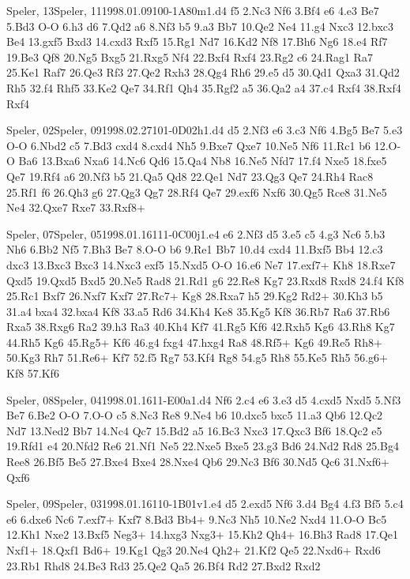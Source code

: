 \documentclass[twocolumn,a4paper,10pt]{report}
\begin{document}
\begin{chessgame}{Speler, 13}{Speler, 11}{1998.01.09}{10}{0-1}{A80m}{1.d4 f5 2.Nc3 Nf6 3.Bf4 e6 4.e3 Be7 5.Bd3 O-O 6.h3 d6 7.Qd2 a6 8.Nf3 b5 9.a3 Bb7 10.Qe2 Ne4 11.g4 Nxc3 12.bxc3 Be4 13.gxf5 Bxd3 14.cxd3 Rxf5 15.Rg1 Nd7 16.Kd2 Nf8 17.Bh6 Ng6 18.e4 Rf7 19.Be3 Qf8 20.Ng5 Bxg5 21.Rxg5 Nf4 22.Bxf4 Rxf4 23.Rg2 c6 24.Rag1 Ra7 25.Ke1 Raf7 26.Qe3 Rf3 27.Qe2 Rxh3 28.Qg4 Rh6 29.e5 d5 30.Qd1 Qxa3 31.Qd2 Rh5 32.f4 Rhf5 33.Ke2 Qe7 34.Rf1 Qh4 35.Rgf2 a5 36.Qa2 a4 37.c4 Rxf4 38.Rxf4 Rxf4}\end{chessgame}
\begin{chessgame}{Speler, 02}{Speler, 09}{1998.02.27}{10}{1-0}{D02h}{1.d4 d5 2.Nf3 e6 3.c3 Nf6 4.Bg5 Be7 5.e3 O-O 6.Nbd2 c5 7.Bd3 cxd4 8.cxd4 Nh5 9.Bxe7 Qxe7 10.Ne5 Nf6 11.Rc1 b6 12.O-O Ba6 13.Bxa6 Nxa6 14.Nc6 Qd6 15.Qa4 Nb8 16.Ne5 Nfd7 17.f4 Nxe5 18.fxe5 Qe7 19.Rf4 a6 20.Nf3 b5 21.Qa5 Qd8 22.Qe1 Nd7 23.Qg3 Qe7 24.Rh4 Rac8 25.Rf1 f6 26.Qh3 g6 27.Qg3 Qg7 28.Rf4 Qe7 29.exf6 Nxf6 30.Qg5 Rce8 31.Ne5 Ne4 32.Qxe7 Rxe7 33.Rxf8+}\end{chessgame}
\begin{chessgame}{Speler, 07}{Speler, 05}{1998.01.16}{11}{1-0}{C00j}{1.e4 e6 2.Nf3 d5 3.e5 c5 4.g3 Nc6 5.b3 Nh6 6.Bb2 Nf5 7.Bh3 Be7 8.O-O b6 9.Re1 Bb7 10.d4 cxd4 11.Bxf5 Bb4 12.c3 dxc3 13.Bxc3 Bxc3 14.Nxc3 exf5 15.Nxd5 O-O 16.e6 Ne7 17.exf7+ Kh8 18.Rxe7 Qxd5 19.Qxd5 Bxd5 20.Ne5 Rad8 21.Rd1 g6 22.Re8 Kg7 23.Rxd8 Rxd8 24.f4 Kf8 25.Rc1 Bxf7 26.Nxf7 Kxf7 27.Rc7+ Kg8 28.Rxa7 h5 29.Kg2 Rd2+ 30.Kh3 b5 31.a4 bxa4 32.bxa4 Kf8 33.a5 Rd6 34.Kh4 Ke8 35.Kg5 Kf8 36.Rb7 Ra6 37.Rb6 Rxa5 38.Rxg6 Ra2 39.h3 Ra3 40.Kh4 Kf7 41.Rg5 Kf6 42.Rxh5 Kg6 43.Rh8 Kg7 44.Rh5 Kg6 45.Rg5+ Kf6 46.g4 fxg4 47.hxg4 Ra8 48.Rf5+ Kg6 49.Re5 Rh8+ 50.Kg3 Rh7 51.Re6+ Kf7 52.f5 Rg7 53.Kf4 Rg8 54.g5 Rh8 55.Ke5 Rh5 56.g6+ Kf8 57.Kf6}\end{chessgame}
\begin{chessgame}{Speler, 08}{Speler, 04}{1998.01.16}{11}{\textonehalf-\textonehalf}{E00a}{1.d4 Nf6 2.c4 e6 3.e3 d5 4.cxd5 Nxd5 5.Nf3 Be7 6.Be2 O-O 7.O-O c5 8.Nc3 Re8 9.Ne4 b6 10.dxc5 bxc5 11.a3 Qb6 12.Qc2 Nd7 13.Ned2 Bb7 14.Nc4 Qc7 15.Bd2 a5 16.Bc3 Nxc3 17.Qxc3 Bf6 18.Qc2 e5 19.Rfd1 e4 20.Nfd2 Re6 21.Nf1 Ne5 22.Nxe5 Bxe5 23.g3 Bd6 24.Nd2 Rd8 25.Bg4 Ree8 26.Bf5 Be5 27.Bxe4 Bxe4 28.Nxe4 Qb6 29.Nc3 Bf6 30.Nd5 Qc6 31.Nxf6+ Qxf6}\end{chessgame}
\begin{chessgame}{Speler, 09}{Speler, 03}{1998.01.16}{11}{0-1}{B01v}{1.e4 d5 2.exd5 Nf6 3.d4 Bg4 4.f3 Bf5 5.c4 e6 6.dxe6 Nc6 7.exf7+ Kxf7 8.Bd3 Bb4+ 9.Nc3 Nh5 10.Ne2 Nxd4 11.O-O Bc5 12.Kh1 Nxe2 13.Bxf5 Neg3+ 14.hxg3 Nxg3+ 15.Kh2 Qh4+ 16.Bh3 Rad8 17.Qe1 Nxf1+ 18.Qxf1 Bd6+ 19.Kg1 Qg3 20.Ne4 Qh2+ 21.Kf2 Qe5 22.Nxd6+ Rxd6 23.Rb1 Rhd8 24.Be3 Rd3 25.Qe2 Qa5 26.Bf4 Rd2 27.Bxd2 Rxd2}\end{chessgame}
\end{document}
